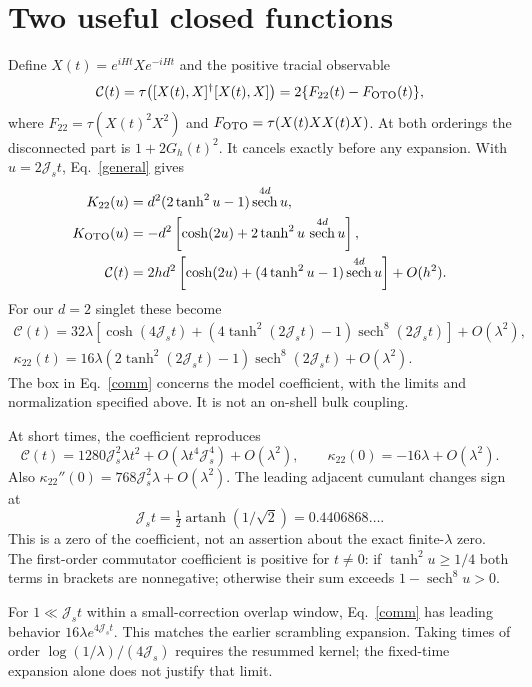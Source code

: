 \documentclass[11pt,a4paper]{article}
\newcommand{\Js}{\mathcal J_s}
\newcommand{\C}{\mathcal C}
\DeclareMathOperator{\sech}{sech}
\begin{document}
\newpage
\section{Two useful closed functions}
Define $X(t)=e^{iHt}Xe^{-iHt}$ and the positive tracial observable
\begin{equation}
 \C(t)=\tau\bigl([X(t),X]^\dagger[X(t),X]\bigr)
 =2\{F_{22}(t)-F_{\rm OTO}(t)\},
\end{equation}
where $F_{22}=\tau(X(t)^2X^2)$ and
$F_{\rm OTO}=\tau(X(t)XX(t)X)$. At both orderings the disconnected
part is $1+2G_h(t)^2$. It cancels exactly before any expansion.
With $u=2\Js t$, Eq.~\eqref{general} gives
\begin{align}
 K_{22}(u)&=d^2(2\tanh^2u-1)\sech^{4d}u,\label{adj}\\
 K_{\rm OTO}(u)&=-d^2\left[\cosh(2u)
 +2\tanh^2u\,\sech^{4d}u\right],\\
 \C(t)&=2hd^2\left[\cosh(2u)
 +(4\tanh^2u-1)\sech^{4d}u\right]+O(h^2).
\end{align}
For our $d=2$ singlet these become
\begin{align}
 \boxed{\C(t)=32\lambda\left[\cosh(4\Js t)
 +(4\tanh^2(2\Js t)-1)\sech^8(2\Js t)\right]+O(\lambda^2),}\label{comm}\\[3mm]
 \kappa_{22}(t)=16\lambda(2\tanh^2(2\Js t)-1)
 \sech^8(2\Js t)+O(\lambda^2).\label{kap}
\end{align}
The box in Eq.~\eqref{comm} concerns the model coefficient, with the limits
and normalization specified above. It is not an on-shell bulk coupling.

At short times, the coefficient reproduces
\begin{equation}
 \C(t)=1280\Js^2\lambda t^2+O(\lambda t^4\Js^4)+O(\lambda^2),\qquad
 \kappa_{22}(0)=-16\lambda+O(\lambda^2).
\end{equation}
Also $\kappa_{22}''(0)=768\Js^2\lambda+O(\lambda^2)$.
The leading adjacent cumulant changes sign at
\[\Js t=\tfrac12\operatorname{artanh}(1/\sqrt2)=0.4406868\ldots.\]
This is a zero of the coefficient, not an assertion about the exact
finite-$\lambda$ zero. The first-order commutator coefficient is positive
for $t\ne0$: if $\tanh^2u\ge1/4$ both terms in brackets are nonnegative;
otherwise their sum exceeds $1-\sech^8u>0$.

For $1\ll\Js t$ within a small-correction overlap window,
Eq.~\eqref{comm} has leading behavior $16\lambda e^{4\Js t}$.
This matches the earlier scrambling expansion. Taking times of order
$\log(1/\lambda)/(4\Js)$ requires the resummed kernel; the fixed-time
expansion alone does not justify that limit.
\end{document}
